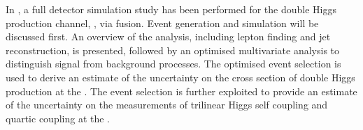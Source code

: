 In , a full \CLICILD detector simulation study has been performed for the double Higgs production channel, \eeToHH, via \WW fusion. Event generation and simulation will be discussed first. An overview of the analysis, including lepton finding and jet reconstruction, is presented, followed by an optimised multivariate analysis to distinguish signal from background processes. The optimised event selection is used to derive an estimate of the uncertainty on the cross section of double Higgs production at the \CLIC. The event selection is further exploited to provide an estimate of the uncertainty on the measurements of  trilinear Higgs self coupling and quartic coupling at the \CLIC.

